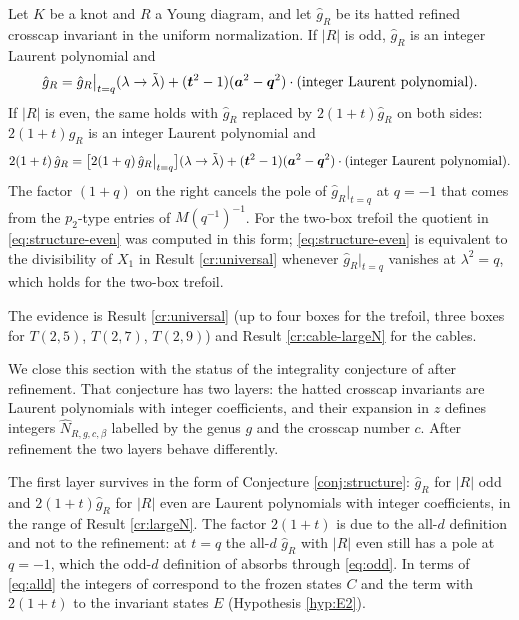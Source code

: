\begin{conjecture}\label{conj:structure}
Let $K$ be a knot and $R$ a Young diagram, and let $\hat g_R$ be its hatted refined crosscap invariant in the uniform normalization. If $|R|$ is odd, $\hat g_R$ is an integer Laurent polynomial and
\begin{equation}\label{eq:structure}
\hat g_R = \hat g_R\big|_{t=q}(\lambda \to \tilde\lambda) + (\bm{t}^2 - 1)(\bm{a}^2 - \bm{q}^2)\cdot(\text{integer Laurent polynomial}).
\end{equation}
If $|R|$ is even, the same holds with $\hat g_R$ replaced by $2(1+t)\hat g_R$ on both sides: $2(1+t)\hat g_R$ is an integer Laurent polynomial and
\begin{equation}\label{eq:structure-even}
2(1+t)\,\hat g_R = \bigl[2(1+q)\,\hat g_R\big|_{t=q}\bigr](\lambda \to \tilde\lambda) + (\bm{t}^2 - 1)(\bm{a}^2 - \bm{q}^2)\cdot(\text{integer Laurent polynomial}).
\end{equation}
The factor $(1+q)$ on the right cancels the pole of $\hat g_R|_{t=q}$ at $q = -1$ that comes from the $p_2$-type entries of $M(q^{-1})^{-1}$. For the two-box trefoil the quotient in \eqref{eq:structure-even} was computed in this form; \eqref{eq:structure-even} is equivalent to the divisibility of $X_1$ in Result \ref{cr:universal} whenever $\hat g_R|_{t=q}$ vanishes at $\lambda^2 = q$, which holds for the two-box trefoil.
\end{conjecture}
The evidence is Result \ref{cr:universal} (up to four boxes for the trefoil, three boxes for $T(2,5)$, $T(2,7)$, $T(2,9)$) and Result \ref{cr:cable-largeN} for the cables.

We close this section with the status of the integrality conjecture of \cite{Marino09} after refinement. That conjecture has two layers: the hatted crosscap invariants are Laurent polynomials with integer coefficients, and their expansion in $z$ defines integers $\hat N_{R,g,c,\beta}$ labelled by the genus $g$ and the crosscap number $c$. After refinement the two layers behave differently.

The first layer survives in the form of Conjecture \ref{conj:structure}: $\hat g_R$ for $|R|$ odd and $2(1+t)\hat g_R$ for $|R|$ even are Laurent polynomials with integer coefficients, in the range of Result \ref{cr:largeN}. The factor $2(1+t)$ is due to the all-$d$ definition and not to the refinement: at $t = q$ the all-$d$ $\hat g_R$ with $|R|$ even still has a pole at $q = -1$, which the odd-$d$ definition of \cite{Marino09} absorbs through \eqref{eq:odd}. In terms of \eqref{eq:alld} the integers of \cite{Marino09} correspond to the frozen states $C$ and the term with $2(1+t)$ to the invariant states $E$ (Hypothesis \ref{hyp:E2}).

